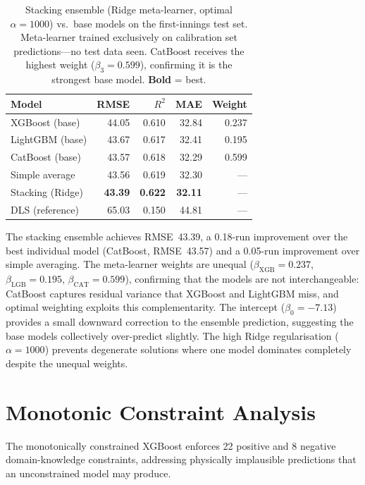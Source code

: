 \documentclass[12pt,a4paper,oneside]{report}
\begin{document}
\begin{table}[htbp]
\centering
\caption[Stacking ensemble results]{Stacking ensemble (Ridge meta-learner, optimal $\alpha = 1000$) vs.\ base models on the first-innings test set.  Meta-learner trained exclusively on calibration set predictions---no test data seen.  CatBoost receives the highest weight ($\beta_3 = 0.599$), confirming it is the strongest base model.  \textbf{Bold} = best.}
\label{tab:stacking}
\small
\begin{tabular}{lrrrr}
\toprule
\textbf{Model} & \textbf{RMSE} & $R^2$ & \textbf{MAE} & \textbf{Weight} \\
\midrule
XGBoost (base)   & 44.05 & 0.610 & 32.84 & 0.237 \\
LightGBM (base)  & 43.67 & 0.617 & 32.41 & 0.195 \\
CatBoost (base)  & 43.57 & 0.618 & 32.29 & 0.599 \\
Simple average   & 43.56 & 0.619 & 32.30 & --- \\
Stacking (Ridge) & \textbf{43.39} & \textbf{0.622} & \textbf{32.11} & --- \\
\midrule
DLS (reference)  & 65.03 & 0.150 & 44.81 & --- \\
\bottomrule
\end{tabular}
\end{table}

The stacking ensemble achieves RMSE~43.39, a 0.18-run improvement over the best individual model (CatBoost, RMSE~43.57) and a 0.05-run improvement over simple averaging.  The meta-learner weights are unequal ($\beta_\text{XGB}=0.237$, $\beta_\text{LGB}=0.195$, $\beta_\text{CAT}=0.599$), confirming that the models are not interchangeable: CatBoost captures residual variance that XGBoost and LightGBM miss, and optimal weighting exploits this complementarity.  The intercept ($\beta_0 = -7.13$) provides a small downward correction to the ensemble prediction, suggesting the base models collectively over-predict slightly.  The high Ridge regularisation ($\alpha = 1000$) prevents degenerate solutions where one model dominates completely despite the unequal weights.

\section{Monotonic Constraint Analysis}
\label{sec:monotonic_results}

The monotonically constrained XGBoost enforces 22 positive and 8 negative domain-knowledge constraints, addressing physically implausible predictions that an unconstrained model may produce.
\end{document}
